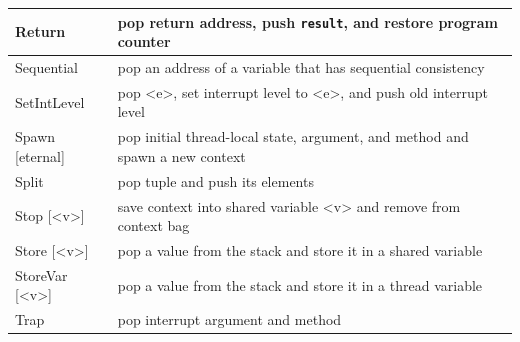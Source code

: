 \documentclass{report}
\begin{document}
{\begin{tabular}{|l|l|}
\hline
Return & pop return address, push \texttt{result}, and restore program counter \\
\hline
Sequential & pop an address of a variable that has sequential consistency \\
\hline
SetIntLevel & pop <{e}>, set interrupt level to <{e}>, and push old interrupt level \\
\hline
Spawn [eternal] & pop initial thread-local state, argument, and method and spawn a new context \\
\hline
Split & pop tuple and push its elements \\
\hline
Stop [<{v}>] & save context into shared variable <{v}> and remove from context bag \\
\hline
Store [<{v}>] & pop a value from the stack and store it in a shared variable \\
\hline
StoreVar [<{v}>] & pop a value from the stack and store it in a thread variable \\
\hline
Trap & pop interrupt argument and method \\
\hline
\end{tabular}
}
\end{document}
